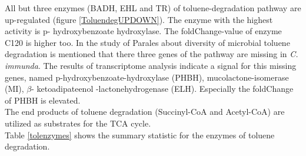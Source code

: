\documentclass[12pt, a4paper]{report}
\begin{document}
All but three enzymes (BADH, EHL and TR) of toluene-degradation pathway are up-regulated (figure \ref{ToluendegUPDOWN}). The enzyme with the highest activity is p- hydroxybenzoate hydroxylase. The foldChange-value of enzyme C120 is higher too. In the study of Parales about diversity of microbial toluene degradation \cite{Parales2008} is mentioned that there three genes of the pathway are missing in \textit{C. immunda}. The results of transcriptome analysis indicate a signal for this missing genes, named p-hydroxybenzoate-hydroxylase (PHBH), mucolactone-isomerase (MI), $\beta$- ketoadipateenol -lactonehydrogenase (ELH). Especially the foldChange of PHBH is elevated.
\\
The end products of toluene degradation (Succinyl-CoA and Acetyl-CoA) are utilized as substrates for the TCA cycle. \\
Table \ref{tolenzymes} shows the summary statistic for the enzymes of toluene degradation. \\
\end{document}
